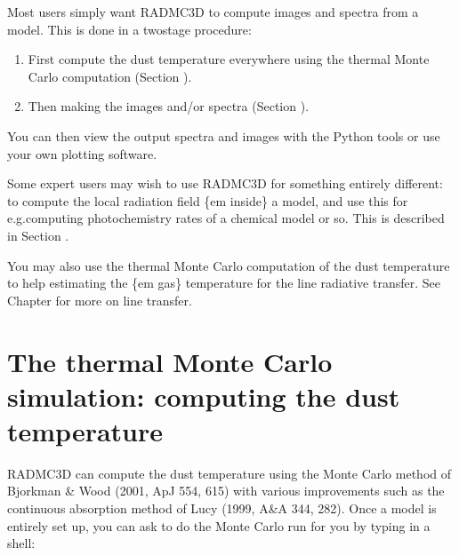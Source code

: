 \documentclass[letterpaper,10pt,english]{sphinxmanual}
\begin{document}
Most users simply want RADMC\sphinxhyphen{}3D to compute images and spectra from a
model. This is done in a two\sphinxhyphen{}stage procedure:
\begin{enumerate}
%
\item {} 
First compute the dust temperature everywhere using the thermal Monte
Carlo computation (Section {\hyperref[\detokenize{dustradtrans:sec-dust-thermal-monte-carlo}]{}}).

\item {} 
Then making the images and/or spectra (Section {\hyperref[\detokenize{dustradtrans:sec-dust-ray-tracing}]{}}).

\end{enumerate}

You can then view the output spectra and images with the Python tools or use
your own plotting software.

Some expert users may wish to use RADMC\sphinxhyphen{}3D for something entirely different:
to compute the local radiation field \{em inside\} a model, and use this
for e.g.computing photochemistry rates of a chemical model or so.
This is described in Section {\hyperref[\detokenize{dustradtrans:sec-dust-monochromatic-monte-carlo}]{}}.

You may also use the thermal Monte Carlo computation of the dust temperature
to help estimating the \{em gas\} temperature for the line radiative transfer.
See Chapter {\hyperref[\detokenize{lineradtrans:chap-line-transfer}]{}} for more on line transfer.


\section{The thermal Monte Carlo simulation: computing the dust temperature}
\label{\detokenize{dustradtrans:the-thermal-monte-carlo-simulation-computing-the-dust-temperature}}\label{\detokenize{dustradtrans:sec-dust-thermal-monte-carlo}}
RADMC\sphinxhyphen{}3D can compute the dust temperature using the Monte Carlo method of
Bjorkman \& Wood (2001, ApJ 554, 615) with various improvements such as the
continuous absorption method of Lucy (1999, A\&A 344, 282). Once a model is
entirely set up, you can ask  to do the Monte Carlo
run for you by typing in a shell:
\end{document}
